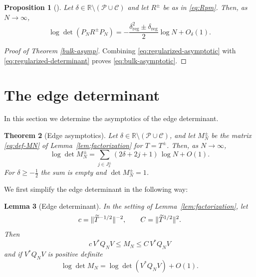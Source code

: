 \documentclass[11pt,a4paper,reqno]{amsart}
\newtheorem{theorem}{Theorem}[section]
\newtheorem{proposition}[theorem]{Proposition}
\newtheorem{lemma}[theorem]{Lemma}
\theoremstyle{remark}
\newcommand{\R}{\mathbb R}
\DeclarePairedDelimiter{\norm}{\lVert}{\rVert}
\begin{document}
\begin{proposition}[{\cite[Thm.~1.1]{Otte}}]\label{prop:otte}
Let $\delta\in\R\setminus(\mathcal P\cup\mathcal C)$ and let $R^\pm$ be as in
\eqref{eq:Rpm}. Then, as $N\to\infty$,
\begin{equation}\label{eq:regularized-asymptotic}
 \log\det(P_NR^\pm P_N)
 =-\frac{\delta_{\text{reg}}^2\pm\delta_{\text{reg}}}{2}\log N+O_\delta(1).
\end{equation}
\end{proposition}

\begin{proof}[Proof of Theorem \ref{bulk-asymp}]
Combining \eqref{eq:regularized-asymptotic} with
\eqref{eq:regularized-determinant} proves \eqref{eq:bulk-asymptotic}.
\end{proof}

\section{The edge determinant}

In this section we determine the asymptotics of the edge determinant.
\begin{theorem}[Edge asymptotics]\label{edge-asymp}
Let $\delta\in\R\setminus(\mathcal P\cup\mathcal C)$, and let $M_N^\pm$ be
the matrix \eqref{eq:def-MN} of Lemma~\ref{lem:factorization} for
$T=T^\pm$. Then, as $N\to\infty$,
\begin{equation}\label{eq:edge-contribution}
 \log\det M_N^\pm
 =
 \sum_{j\in J^\pm_\delta}(2\delta+2j+1)
 \,
 \log N+O(1).
\end{equation}
For $\delta\geq-\frac12$ the sum is empty and $\det M_N^\pm=1$.
\end{theorem}

We first simplify the edge determinant in the following way:

\begin{lemma}[Edge determinant]\label{lem:edge-determinant}
In the setting of Lemma~\ref{lem:factorization}, let
\begin{equation}\label{eq:loewner-constants}
 c=\norm{\widetilde T^{-1/2}}^{-2},
 \qquad
 C=\norm{\widetilde T^{1/2}}^2.
\end{equation}
Then
\begin{equation}\label{eq:loewner-tail}
 c\,V^*Q_NV\le M_N\le C\,V^*Q_NV
\end{equation}
and if $V^*Q_NV$ is positive definite
\begin{equation}\label{eq:edge-logdet}
 \log\det M_N
 =\log\det(V^*Q_NV)+O(1).
\end{equation}
\end{lemma}
\end{document}
